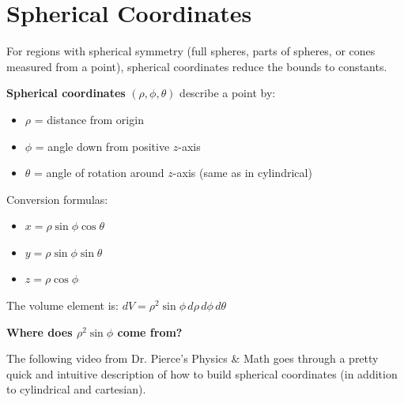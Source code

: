 \documentclass{ximera}
\begin{document}
\section*{Spherical Coordinates}

For regions with spherical symmetry (full spheres, parts of spheres, or cones measured from a point), spherical coordinates reduce the bounds to constants.

\begin{definition}
\textbf{Spherical coordinates} $(\rho, \phi, \theta)$ describe a point by:
\begin{itemize}
    \item $\rho$ = distance from origin
    \item $\phi$ = angle down from positive $z$-axis
    \item $\theta$ = angle of rotation around $z$-axis (same as in cylindrical)
\end{itemize}

Conversion formulas:
\begin{itemize}
    \item $x = \rho\sin\phi\cos\theta$
    \item $y = \rho\sin\phi\sin\theta$
    \item $z = \rho\cos\phi$
\end{itemize}

The volume element is: $dV = \rho^2\sin\phi\,d\rho\,d\phi\,d\theta$
\end{definition}

\textbf{Where does $\rho^2\sin\phi$ come from?}

The following video from Dr. Pierce's Physics \& Math goes through a pretty quick and intuitive description of how to build spherical coordinates (in addition to cylindrical and cartesian).

\begin{center}
\end{center}

\end{document}
